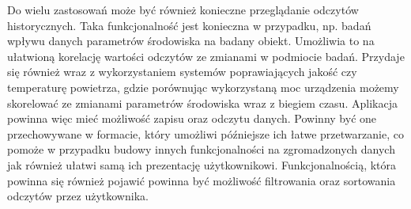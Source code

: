 Do wielu zastosowań może być również konieczne przeglądanie odczytów historycznych.
Taka funkcjonalność jest konieczna w przypadku, np. badań wpływu danych
parametrów środowiska na badany obiekt. Umożliwia to na ułatwioną korelację
wartości odczytów ze zmianami w podmiocie badań. Przydaje się również 
wraz z wykorzystaniem systemów poprawiających jakość czy temperaturę
powietrza, gdzie porównując wykorzystaną moc urządzenia możemy skorelować
ze zmianami parametrów środowiska wraz z biegiem czasu.
Aplikacja powinna więc mieć możliwość zapisu oraz odczytu danych. Powinny być
one przechowywane w formacie, który umożliwi późniejsze ich łatwe przetwarzanie,
co pomoże w przypadku budowy innych funkcjonalności na zgromadzonych danych
jak również ułatwi samą ich prezentację użytkownikowi. Funkcjonalnością, która
powinna się również pojawić powinna być możliwość filtrowania oraz sortowania
odczytów przez użytkownika.
